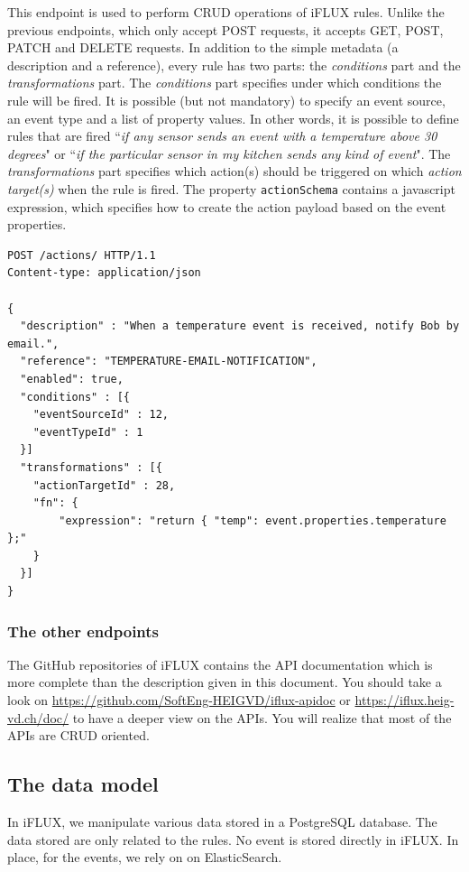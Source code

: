 This endpoint is used to perform CRUD operations of iFLUX rules. Unlike the previous endpoints, which only accept POST requests, it accepts GET, POST, PATCH and DELETE requests. In addition to the simple metadata (a description and a reference), every rule has two parts: the \emph{conditions} part and the \emph{transformations} part. The \emph{conditions} part specifies under which conditions the rule will be fired. It is possible (but not mandatory) to specify an event source, an event type and a list of property values. In other words, it is possible to define rules that are fired ``\emph{if any sensor sends an event with a temperature above 30 degrees}" or ``\emph{if the particular sensor in my kitchen sends any kind of event}". The \emph{transformations} part specifies which action(s) should be triggered on which \emph{action target(s)} when the rule is fired. The property \texttt{actionSchema} contains a javascript expression, which specifies how to create the action payload based on the event properties.

\begin{lstlisting}
POST /actions/ HTTP/1.1
Content-type: application/json

{
  "description" : "When a temperature event is received, notify Bob by email.",
  "reference": "TEMPERATURE-EMAIL-NOTIFICATION",
  "enabled": true,
  "conditions" : [{
    "eventSourceId" : 12,
    "eventTypeId" : 1
  }]
  "transformations" : [{
    "actionTargetId" : 28,
    "fn": {
    	"expression": "return { "temp": event.properties.temperature };"
    }
  }]
}\end{lstlisting}

\subsubsection{The other endpoints}

The GitHub repositories of iFLUX contains the API documentation which is more complete than the description given in this document. You should take a look on \url{https://github.com/SoftEng-HEIGVD/iflux-apidoc} or \url{https://iflux.heig-vd.ch/doc/} to have a deeper view on the APIs. You will realize that most of the APIs are CRUD oriented.

\subsection{The data model}

In iFLUX, we manipulate various data stored in a PostgreSQL database. The data stored are only related to the rules. No event is stored directly in iFLUX. In place, for the events, we rely on on ElasticSearch.

